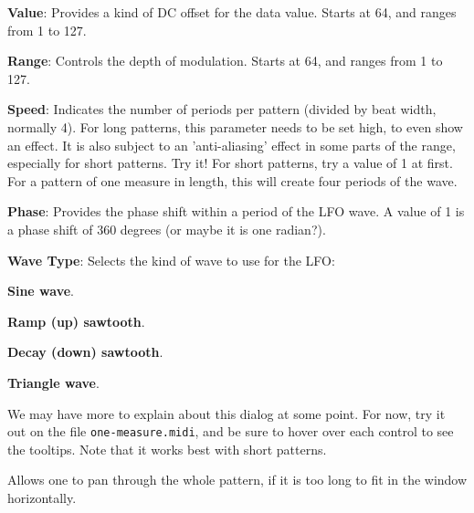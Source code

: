 

   \begin{enumber}
      \item \textbf{Value}:
         Provides a kind of DC offset for the data value. Starts at 64, and
         ranges from 1 to 127.
      \item \textbf{Range}:
         Controls the depth of modulation. Starts at 64, and ranges from 1 to
         127.
      \item \textbf{Speed}:
         Indicates the number of periods per pattern (divided by beat width,
         normally 4).  For long patterns, this parameter needs to be set high,
         to even show an effect.  It is also subject to an 'anti-aliasing'
         effect in some parts of the range, especially for short patterns.
         Try it!  For short patterns, try a value of 1 at first.  For a pattern
         of one measure in length, this will create four periods of the wave.
      \item \textbf{Phase}:
         Provides the phase shift within a period of the LFO wave.
         A value of 1 is a phase shift of 360 degrees (or maybe it is one
         radian?).
      \item \textbf{Wave Type}:
         Selects the kind of wave to use for the LFO:
         \begin{enumber}
            \item \textbf{Sine wave}.
            \item \textbf{Ramp (up) sawtooth}.
            \item \textbf{Decay (down) sawtooth}.
            \item \textbf{Triangle wave}.
         \end{enumber}
   \end{enumber}

   We may have more to explain about this dialog at some point.  For now,
   try it out on the file \texttt{one-measure.midi}, and be sure to hover over
   each control to see the tooltips.
   Note that it works best with short patterns.

   Allows one to pan through the whole pattern, if it is too long to fit in
   the window horizontally.

